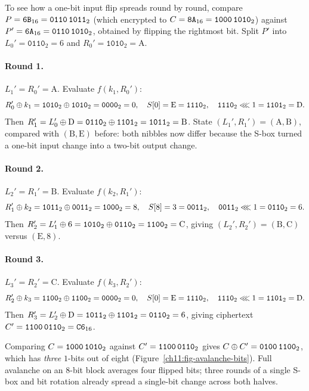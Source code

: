 To see how a one-bit input flip spreads round by round, compare $P = \texttt{6B}_{16} = \texttt{0110\,1011}_2$ (which encrypted to $C = \texttt{8A}_{16} = \texttt{1000\,1010}_2$) against $P' = \texttt{6A}_{16} = \texttt{0110\,1010}_2$, obtained by flipping the rightmost bit. Split $P'$ into $L_0' = \texttt{0110}_2 = 6$ and $R_0' = \texttt{1010}_2 = \mathrm{A}$.

\paragraph{Round 1.} $L_1' = R_0' = \mathrm{A}$. Evaluate $f(k_1, R_0')$:
\[
R_0' \oplus k_1 = \texttt{1010}_2 \oplus \texttt{1010}_2 = \texttt{0000}_2 = 0,\quad
S[0] = \mathrm{E} = \texttt{1110}_2,\quad
\texttt{1110}_2 \lll 1 = \texttt{1101}_2 = \mathrm{D}.
\]
Then $R_1' = L_0' \oplus \mathrm{D} = \texttt{0110}_2 \oplus \texttt{1101}_2 = \texttt{1011}_2 = \mathrm{B}$. State $(L_1', R_1') = (\mathrm{A},\mathrm{B})$, compared with $(\mathrm{B},\mathrm{E})$ before: both nibbles now differ because the S-box turned a one-bit input change into a two-bit output change.

\paragraph{Round 2.} $L_2' = R_1' = \mathrm{B}$. Evaluate $f(k_2, R_1')$:
\[
R_1' \oplus k_2 = \texttt{1011}_2 \oplus \texttt{0011}_2 = \texttt{1000}_2 = 8,\quad
S[8] = 3 = \texttt{0011}_2,\quad
\texttt{0011}_2 \lll 1 = \texttt{0110}_2 = 6.
\]
Then $R_2' = L_1' \oplus 6 = \texttt{1010}_2 \oplus \texttt{0110}_2 = \texttt{1100}_2 = \mathrm{C}$, giving $(L_2', R_2') = (\mathrm{B},\mathrm{C})$ versus $(\mathrm{E},8)$.

\paragraph{Round 3.} $L_3' = R_2' = \mathrm{C}$. Evaluate $f(k_3, R_2')$:
\[
R_2' \oplus k_3 = \texttt{1100}_2 \oplus \texttt{1100}_2 = \texttt{0000}_2 = 0,\quad
S[0] = \mathrm{E} = \texttt{1110}_2,\quad
\texttt{1110}_2 \lll 1 = \texttt{1101}_2 = \mathrm{D}.
\]
Then $R_3' = L_2' \oplus \mathrm{D} = \texttt{1011}_2 \oplus \texttt{1101}_2 = \texttt{0110}_2 = 6$, giving ciphertext $C' = \texttt{1100\,0110}_2 = \texttt{C6}_{16}$.

Comparing $C = \texttt{1000\,1010}_2$ against $C' = \texttt{1100\,0110}_2$ gives $C \oplus C' = \texttt{0100\,1100}_2$, which has \emph{three} $1$-bits out of eight (Figure~\ref{ch11:fig-avalanche-bits}). Full avalanche on an 8-bit block averages four flipped bits; three rounds of a single S-box and bit rotation already spread a single-bit change across both halves.

